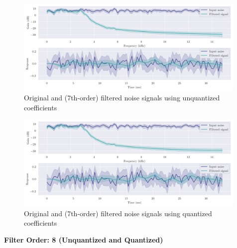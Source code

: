 \begin{figure}[!ht]
    \centering
    \includegraphics[width=0.99\textwidth]{images/q8_7th_stability.png}
    \caption{Original and (7th-order) filtered noise signals using unquantized coefficients}
\end{figure}

\begin{figure}[!ht]
    \centering
    \includegraphics[width=0.99\textwidth]{images/q8_q7th_stability.png}
    \caption{Original and (7th-order) filtered noise signals using quantized coefficients}
\end{figure}

\newpage
{\Large\textbf{Filter Order: 8 (Unquantized and Quantized)}}
\vfill

